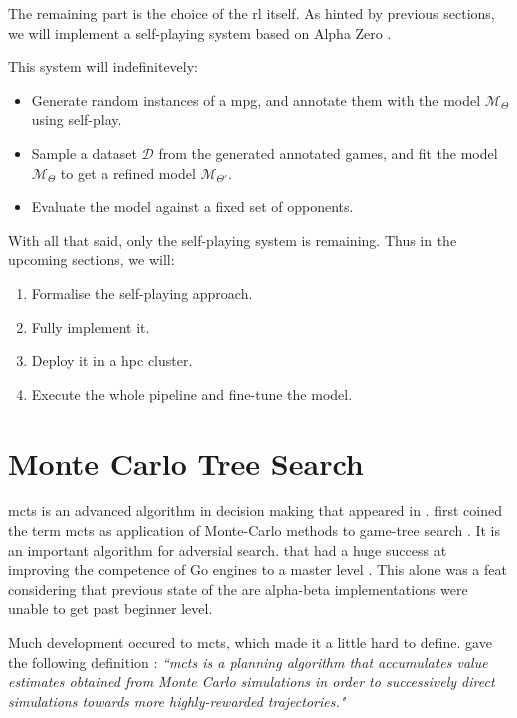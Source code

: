 The remaining part is the choice of the \acrshort{rl} itself. As hinted by previous sections, we will implement a self-playing system based on Alpha Zero \cite{AlphaZero}.

This system will indefinitevely:
\begin{itemize}
	\item Generate random instances of a \acrshort{mpg}, and annotate them with the model $\mathcal{M}_{\Theta}$ using self-play.
	\item Sample a dataset $\mathcal{D}$ from the generated annotated games, and fit the model $\mathcal{M}_{\Theta}$ to get a refined model $\mathcal{M}_{\Theta'}.$
	\item Evaluate the model against a fixed set of opponents.
\end{itemize}
With all that said, only the self-playing system is remaining. Thus in the upcoming sections, we will:
\begin{enumerate}
	\item Formalise the self-playing approach.
	\item Fully implement it.
	\item Deploy it in a \acrshort{hpc} cluster.
	\item Execute the whole pipeline and fine-tune the model.
\end{enumerate}

\section{Monte Carlo Tree Search}
\acrfull{mcts} is an advanced algorithm in decision making that appeared in . \citeauthor{MCTSOriginal} first coined the term \acrshort{mcts} as application of Monte-Carlo methods to game-tree search \cite{MCTSOriginal}. It is an important algorithm for adversial search. that had a huge success at improving the competence of Go engines to a master level \cite{GoMaster}. This alone was a feat considering that previous state of the are alpha-beta implementations were unable to get past beginner level. 

Much development occured to \acrshort{mcts}, which made it a little hard to define. \citeauthor{RLIntroduction} gave the following definition \cite[section.~8.8]{RLIntroduction}: \textit{``\acrfull{mcts} is a planning algorithm that accumulates value estimates obtained from Monte Carlo simulations in order to successively direct simulations towards more highly-rewarded trajectories."}

